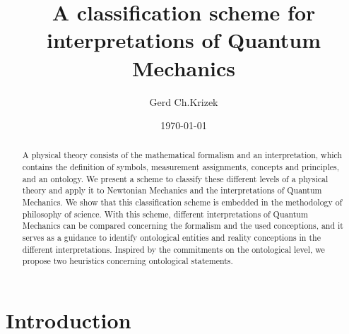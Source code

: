 \documentclass{article}
\date{\today}
\begin{document}
\title{A classification scheme for interpretations of Quantum Mechanics}
\author[1]{Gerd Ch.Krizek}


\maketitle

%


\begin{abstract}
\noindent %
A physical theory consists of the mathematical formalism and an interpretation, which contains the definition of symbols, measurement assignments, concepts and principles, and an ontology. We present a scheme to classify these different levels of a physical theory and apply it to Newtonian Mechanics and the interpretations of Quantum Mechanics. We show that this classification scheme is embedded in the methodology of philosophy of science. With this scheme, different interpretations of Quantum Mechanics can be compared concerning the formalism and the used conceptions, and it serves as a guidance to identify ontological entities and reality conceptions in the different interpretations. Inspired by the commitments on the ontological level, we propose two heuristics concerning ontological statements. 

\end{abstract}

\newpage

\section{Introduction}
\parindent 0cm       %
\end{document}
